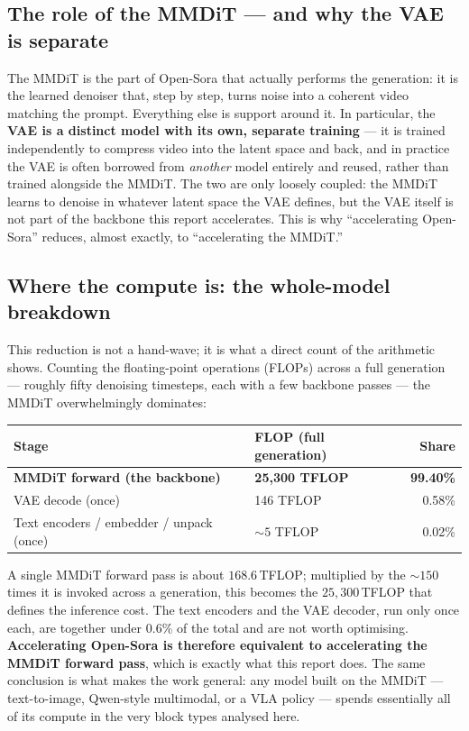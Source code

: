 \documentclass[11pt]{report}
\begin{document}
\subsection{The role of the MMDiT --- and why the VAE is separate}

The MMDiT is the part of Open-Sora that actually performs the generation:
it is the learned denoiser that, step by step, turns noise into a coherent
video matching the prompt. Everything else is support around it. In
particular, the \textbf{VAE is a distinct model with its own, separate
training} --- it is trained independently to compress video into the
latent space and back, and in practice the VAE is often borrowed from
\emph{another} model entirely and reused, rather than trained alongside the
MMDiT. The two are only loosely coupled: the MMDiT learns to denoise in
whatever latent space the VAE defines, but the VAE itself is not part of
the backbone this report accelerates. This is why ``accelerating
Open-Sora'' reduces, almost exactly, to ``accelerating the MMDiT.''

\subsection{Where the compute is: the whole-model breakdown}
\label{sec:compute-breakdown}

This reduction is not a hand-wave; it is what a direct count of the
arithmetic shows. Counting the floating-point operations (FLOPs) across a
full generation --- roughly fifty denoising timesteps, each with a few
backbone passes --- the MMDiT overwhelmingly dominates:

\begin{center}
\begin{tabular}{@{}llr@{}}
\toprule
Stage & FLOP (full generation) & Share \\
\midrule
\textbf{MMDiT forward (the backbone)} & \textbf{25{,}300 TFLOP} & \textbf{99.40\%} \\
VAE decode (once) & 146 TFLOP & 0.58\% \\
Text encoders / embedder / unpack (once) & ${\sim}5$ TFLOP & 0.02\% \\
\bottomrule
\end{tabular}
\end{center}

A single MMDiT forward pass is about $168.6$\,TFLOP; multiplied by the
${\sim}150$ times it is invoked across a generation, this becomes the
$25{,}300$\,TFLOP that defines the inference cost. The text encoders and
the VAE decoder, run only once each, are together under $0.6\%$ of the
total and are not worth optimising. \textbf{Accelerating Open-Sora is
therefore equivalent to accelerating the MMDiT forward pass}, which is
exactly what this report does. The same conclusion is what makes the work
general: any model built on the MMDiT --- text-to-image, Qwen-style
multimodal, or a VLA policy --- spends essentially all of its compute in
the very block types analysed here.
\end{document}
